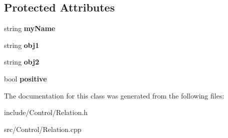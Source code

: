 \subsection*{Protected Attributes}
\begin{DoxyCompactItemize}
\item 
\hypertarget{classCartWheel_1_1Relation_ab5fca905a31b651644bc1bf9fbf22496}{
string {\bfseries myName}}
\label{classCartWheel_1_1Relation_ab5fca905a31b651644bc1bf9fbf22496}

\item 
\hypertarget{classCartWheel_1_1Relation_ad9c80f0df7a4eb1667fd48960ff54651}{
string {\bfseries obj1}}
\label{classCartWheel_1_1Relation_ad9c80f0df7a4eb1667fd48960ff54651}

\item 
\hypertarget{classCartWheel_1_1Relation_a207a4bbc0180c64aaee80bdbe502eeec}{
string {\bfseries obj2}}
\label{classCartWheel_1_1Relation_a207a4bbc0180c64aaee80bdbe502eeec}

\item 
\hypertarget{classCartWheel_1_1Relation_aa0a6b3d14b4ef7ad957f1b61a3200219}{
bool {\bfseries positive}}
\label{classCartWheel_1_1Relation_aa0a6b3d14b4ef7ad957f1b61a3200219}

\end{DoxyCompactItemize}


The documentation for this class was generated from the following files:\begin{DoxyCompactItemize}
\item 
include/Control/Relation.h\item 
src/Control/Relation.cpp\end{DoxyCompactItemize}
